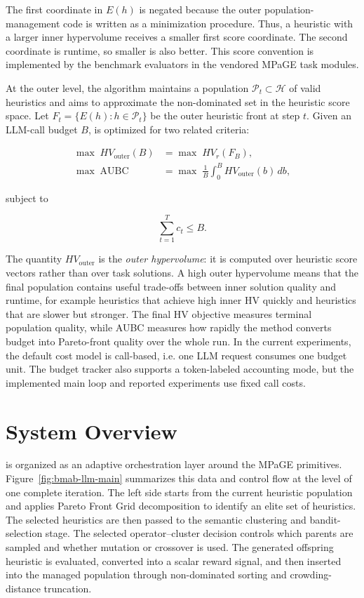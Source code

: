 \documentclass[../main.tex]{subfiles}
\begin{document}
The first coordinate in $E(h)$ is negated because the outer population-management code is written as a minimization procedure. Thus, a heuristic with a larger inner hypervolume receives a smaller first score coordinate. The second coordinate is runtime, so smaller is also better. This score convention is implemented by the benchmark evaluators in the vendored MPaGE task modules.

At the outer level, the algorithm maintains a population $\mathcal{P}_t \subset \mathcal{H}$ of valid heuristics and aims to approximate the non-dominated set in the heuristic score space. Let $F_t = \{E(h): h \in \mathcal{P}_t\}$ be the outer heuristic front at step $t$. Given an LLM-call budget $B$, \bmab{} is optimized for two related criteria:

\begin{align}
  \max \; HV_{\text{outer}}(B)
  &= \max \; HV_r(F_B), \\
  \max \; \mathrm{AUBC}
  &= \max \; \frac{1}{B}\int_0^B HV_{\text{outer}}(b)\,db,
  \label{eq:aubc-objective}
\end{align}

subject to

\begin{equation}
  \sum_{t=1}^{T} c_t \le B.
\end{equation}

The quantity $HV_{\text{outer}}$ is the \emph{outer hypervolume}: it is computed over heuristic score vectors rather than over task solutions. A high outer hypervolume means that the final population contains useful trade-offs between inner solution quality and runtime, for example heuristics that achieve high inner HV quickly and heuristics that are slower but stronger. The final HV objective measures terminal population quality, while AUBC measures how rapidly the method converts budget into Pareto-front quality over the whole run. In the current experiments, the default cost model is call-based, i.e. one LLM request consumes one budget unit. The budget tracker also supports a token-labeled accounting mode, but the implemented main loop and reported experiments use fixed call costs.

\section{System Overview}

\bmab{} is organized as an adaptive orchestration layer around the MPaGE primitives. Figure~\ref{fig:bmab-llm-main} summarizes this data and control flow at the level of one complete iteration. The left side starts from the current heuristic population and applies Pareto Front Grid decomposition to identify an elite set of heuristics. The selected heuristics are then passed to the semantic clustering and bandit-selection stage. The selected operator--cluster decision controls which parents are sampled and whether mutation or crossover is used. The generated offspring heuristic is evaluated, converted into a scalar reward signal, and then inserted into the managed population through non-dominated sorting and crowding-distance truncation.
\end{document}
